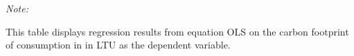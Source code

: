 \begin{table}[htbp!]
\begin{adjustbox}{width = 1\textwidth, max height = 0.95\textheight, center}
\begin{threeparttable}[b]
         \begin{tablenotes}\item \medskip \textit{Note:}
            \item This table displays regression results from equation OLS on the carbon footprint of consumption in  in LTU as the dependent variable.  
         \end{tablenotes}
      \end{threeparttable}
   \end{adjustbox}
\end{table}


